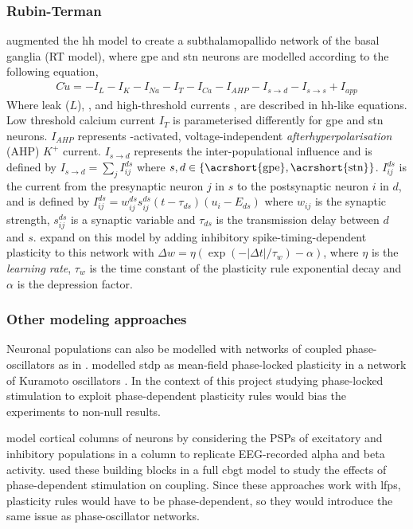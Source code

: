 \subsubsection{Rubin-Terman}
\cite{terman2002activity} augmented the \acrshort{hh} model to create a subthalamopallido network of the
basal ganglia (RT model), where \acrshort{gpe} and \acrshort{stn} neurons are modelled according to the following equation,
\begin{align}
	C \dot u = - I_L - I_K - I_{Na} - I_T - I_{Ca} - I_{AHP} - I_{s \rightarrow d} -
	I_{s \rightarrow s} + I_{app}
\end{align}
Where leak ($L$), \K, \Na and high-threshold \Ca currents \cite{song2000characterization}, are
described in \acrshort{hh}-like equations. Low threshold calcium current $I_T$ is parameterised differently for \acrshort{gpe} and
\acrshort{stn} neurons. $I_{AHP}$ represents \Ca-activated, voltage-independent \textit{afterhyperpolarisation}
(AHP) $K^+$ current. $I_{s \rightarrow d}$ represents the inter-populational influence and is
defined by
$I_{s \rightarrow d} = \sum_{j} I_{ij}^{ds}$ where $s, d \in \{\text{\acrshort{gpe}}, \text{\acrshort{stn}}\}$.
$I_{ij}^{ds}$ is the current from the presynaptic neuron $j$ in $s$ to the
postsynaptic neuron $i$ in $d$, and is defined by
$I_{ij}^{ds} = w_{ij}^{ds}s_{ij}^{ds}(t - \tau_{ds})(u_i - E_{ds})$ where $w_{ij}$ is the
synaptic strength, $s_{ij}^{ds}$ is a synaptic variable and $\tau_{ds}$ is the transmission
delay between $d$ and $s$.
\cite{madadi2022inhibitory} expand on this model by adding inhibitory spike-timing-dependent
plasticity to this network with $\Delta w = \eta(\exp(-|\Delta t| / \tau_w) - \alpha)$,
where $\eta$ is the \textit{learning rate}, $\tau_w$ is the time constant of the plasticity
rule exponential decay and $\alpha$ is the depression factor.

\subsubsection{Other modeling approaches}
Neuronal populations can also be modelled with networks of coupled phase-oscillators as in
\cite{tass2006long}. \cite{duchet2023mean} modelled \acrshort{stdp} as mean-field phase-locked plasticity in a network of
Kuramoto oscillators \cite{kuramoto1984phase}. In the context of this project studying phase-locked stimulation
to exploit phase-dependent plasticity rules would bias the experiments to non-null results.

\cite{jansen1995electroencephalogram} model cortical columns of neurons by considering the PSPs of
excitatory and inhibitory populations in a column to replicate EEG-recorded alpha and beta activity.
\cite{west2022stimulating} used these building blocks in a full \acrshort{cbgt} model to study the effects of
phase-dependent stimulation on coupling. Since these approaches work with \acrshort{lfp}s, plasticity
rules would have to be phase-dependent, so they would introduce the same issue as phase-oscillator networks.

